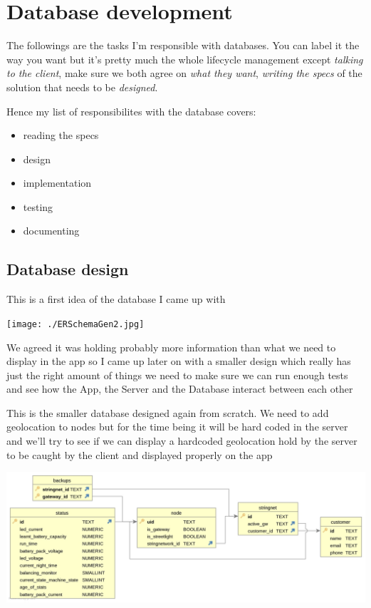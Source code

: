 \documentclass[a4paper,12pt]{book}
\begin{document}
\part{Database development}

The followings are the tasks I'm responsible with databases. You can label it the way you want but it's pretty much the whole lifecycle management except \emph{talking to the client}, make sure we both agree on \emph{what they want}, \emph{writing the specs} of the solution that needs to be \emph{designed}.

Hence my list of responsibilites with the database covers:

\begin{itemize}
\item {reading the specs}
\item design
\item implementation
\item testing 
\item documenting
\end{itemize}

\clearpage

\chapter{Database design}
This is a first idea of the database I came up with

\noindent\texttt{[image: ./ERSchemaGen2.jpg]}

We agreed it was holding probably more information than what we need to display in the app so I came up later on with a smaller design which really has just the right amount of things we need to make sure we can run enough tests and see how the App, the Server and the Database interact between each other
\clearpage

This is the smaller database designed again from scratch. We need to add geolocation to nodes but for the time being it will be hard coded in the server and we'll try to see if we can display a hardcoded geolocation hold by the server to be caught by the client and displayed properly on the app

\noindent\includegraphics[width=14cm]{./SecondERSchemaGen2.jpg}

\printindex
\end{document}

